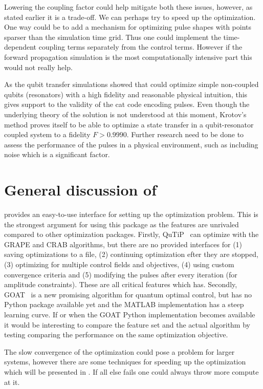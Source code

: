 \documentclass[main.tex]{subfiles}
\begin{document}
Lowering the coupling factor could help mitigate both these issues, however, as stated earlier it is a trade-off.
We can perhaps try to speed up the optimization.
One way could be to add a mechanism for optimizing pulse shapes with points sparser than the simulation time grid.
Thus one could implement the time-dependent coupling terms separately from the control terms.
However if the forward propagation simulation is the most computationally intensive part this would not really help.

As the qubit transfer simulations showed that \krotov{} could optimize simple non-coupled qubits (resonators) with a high fidelity and reasonable physical intuition, this gives support to the validity of the cat code encoding pulses.
Even though the underlying theory of the solution is not understood at this moment, Krotov's method proves itself to be able to optimize a state transfer in a qubit-resonator coupled system to a fidelity \(F > 0.9990\).
Further research need to be done to assess the performance of the pulses in a physical environment, such as including noise which is a significant factor.

\section{General discussion of \krotov{}}
\label{sec:general}
\krotov{} provides an easy-to-use interface for setting up the optimization problem.
This is the strongest argument for using this package as the features are unrivaled compared to other optimization packages.
Firstly, QuTiP~\cite{johansson_qutip_2013} can optimize with the GRAPE and CRAB algorithms, but there are no provided interfaces for
(1) saving optimizations to a file,
(2) continuing optimization efter they are stopped,
(3) optimizing for multiple control fields and objectives,
(4) using custom convergence criteria and 
(5) modifying the pulses after every iteration (for amplitude constraints).
These are all critical features which \krotov{} has.
Secondly, GOAT~\cite{machnes_gradient_2015} is a new promising algorithm for quantum optimal control, but has no Python package available yet and the MATLAB implementation has a steep learning curve.
If or when the GOAT Python implementation becomes available it would be interesting to compare the feature set and the actual algorithm by testing comparing the performance on the same optimization objective.

The slow convergence of the optimization could pose a problem for larger systems, however there are some techniques for speeding up the optimization which will be presented in .
If all else fails one could always throw more compute at it.
\end{document}

